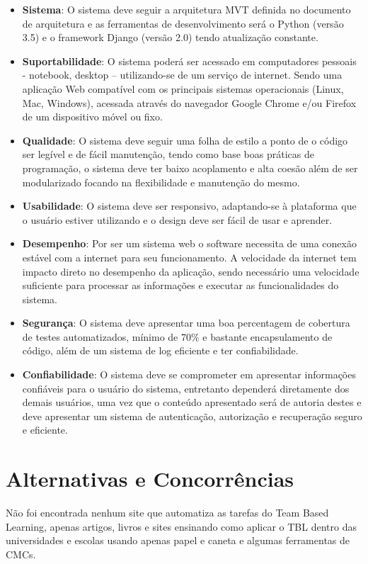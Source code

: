 \begin{itemize}
  \item \textbf{Sistema}: O sistema deve seguir a arquitetura MVT definida no documento de arquitetura e as ferramentas de desenvolvimento será o Python (versão 3.5) e o framework Django (versão 2.0) tendo atualização constante.
  \item \textbf{Suportabilidade}: O sistema poderá ser acessado em computadores pessoais - notebook, desktop – utilizando-se de um serviço de internet. Sendo uma aplicação Web compatível com os principais sistemas operacionais (Linux, Mac, Windows), acessada através do navegador Google Chrome e/ou Firefox de um dispositivo móvel ou fixo.
  \item \textbf{Qualidade}: O sistema deve seguir uma folha de estilo a ponto de o código ser legível e de fácil manutenção, tendo como base boas práticas de programação, o sistema deve ter baixo acoplamento e alta coesão além de ser modularizado focando na flexibilidade e manutenção do mesmo.
  \item \textbf{Usabilidade}: O sistema deve ser responsivo, adaptando-se à plataforma que o usuário estiver utilizando e o design deve ser fácil de usar e aprender.
  \item \textbf{Desempenho}: Por ser um sistema web o software necessita de uma conexão estável com a internet para seu funcionamento. A velocidade da internet tem impacto direto no desempenho da aplicação, sendo necessário uma velocidade suficiente para processar as informações e executar as funcionalidades do sistema.
  \item \textbf{Segurança}: O sistema deve apresentar uma boa percentagem de cobertura de testes automatizados, mínimo de 70\% e bastante encapsulamento de código, além de um sistema de log eficiente e ter confiabilidade.
  \item \textbf{Confiabilidade}: O sistema deve se comprometer em apresentar informações confiáveis para o usuário do sistema, entretanto dependerá diretamente dos demais usuários, uma vez que o conteúdo apresentado será de autoria destes e deve apresentar um sistema de autenticação, autorização e recuperação seguro e eficiente.
\end{itemize}

\section{Alternativas e Concorrências}

Não foi encontrada nenhum site que automatiza as tarefas do Team Based Learning, apenas artigos, livros e sites ensinando como aplicar o TBL dentro das universidades e escolas usando apenas papel e caneta e algumas ferramentas de CMCs.


